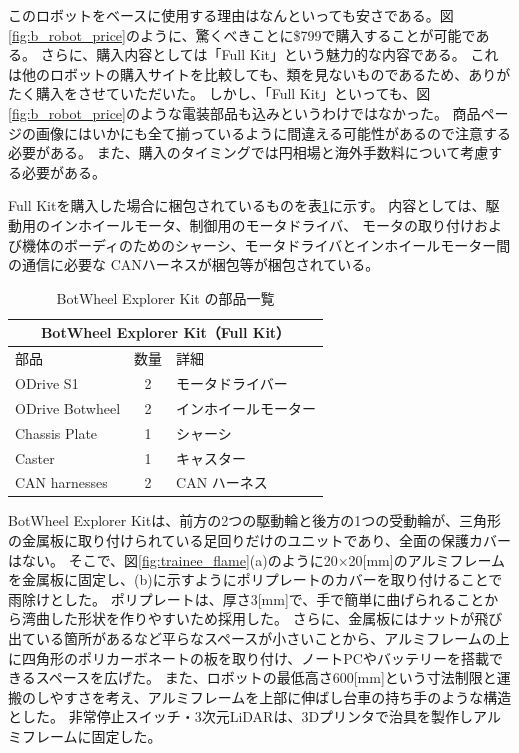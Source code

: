 \documentclass[twocolumn,9pt]{jsproceedings}
\begin{document}
このロボットをベースに使用する理由はなんといっても安さである。図\ref{fig:b_robot_price}のように、驚くべきことに\$799で購入することが可能である。
さらに、購入内容としては「Full Kit」という魅力的な内容である。
これは他のロボットの購入サイトを比較しても、類を見ないものであるため、ありがたく購入をさせていただいた。
しかし、「Full Kit」といっても、図\ref{fig:b_robot_price}のような電装部品も込みというわけではなかった。
商品ページの画像にはいかにも全て揃っているように間違える可能性があるので注意する必要がある。
また、購入のタイミングでは円相場と海外手数料について考慮する必要がある。

Full Kitを購入した場合に梱包されているものを表\ref{tab:botwheel_kit}に示す。
内容としては、駆動用のインホイールモータ、制御用のモータドライバ、
モータの取り付けおよび機体のボーディのためのシャーシ、モータドライバとインホイールモーター間の通信に必要な
CANハーネスが梱包等が梱包されている。
\begin{table}[h]
  \centering
  \begin{tabular}{|l|c|l|}
      \hline
      \multicolumn{3}{|c|}{\textbf{BotWheel Explorer Kit（Full Kit）}} \\
      \hline
      部品 & 数量 & 詳細 \\
      \hline
      ODrive S1 & 2 & モータドライバー \\
      ODrive Botwheel & 2 & インホイールモーター \\
      Chassis Plate & 1 & シャーシ \\
      Caster & 1 & キャスター \\
      CAN harnesses & 2 & CAN ハーネス \\
      \hline
  \end{tabular}
  \caption{BotWheel Explorer Kit の部品一覧}
  \label{tab:botwheel_kit}
\end{table}


BotWheel Explorer Kitは、前方の2つの駆動輪と後方の1つの受動輪が、三角形の金属板に取り付けられている足回りだけのユニットであり、全面の保護カバーはない。
そこで、図\ref{fig:trainee_flame}(a)のように20×20[mm]のアルミフレームを金属板に固定し、(b)に示すようにポリプレートのカバーを取り付けることで雨除けとした。
ポリプレートは、厚さ3[mm]で、手で簡単に曲げられることから湾曲した形状を作りやすいため採用した。
さらに、金属板にはナットが飛び出ている箇所があるなど平らなスペースが小さいことから、アルミフレームの上に四角形のポリカーボネート\cite{PE960_1}の板を取り付け、ノートPCやバッテリーを搭載できるスペースを広げた。
また、ロボットの最低高さ600[mm]という寸法制限と運搬のしやすさを考え、アルミフレームを上部に伸ばし台車の持ち手のような構造とした。
非常停止スイッチ・3次元LiDARは、3Dプリンタで治具を製作しアルミフレームに固定した。
\end{document}
